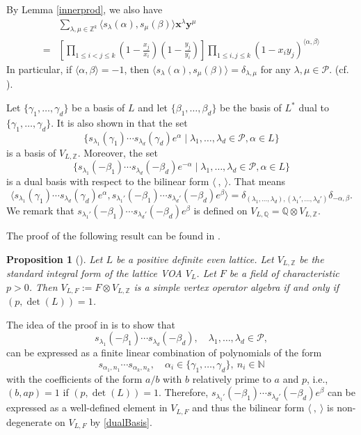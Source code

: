 \documentclass[12pt]{article}
\def\QQ{{\mathbb Q}}
\def\ZZ{{\mathbb Z}}
\def\NN{{\mathbb N}}
\newcommand{\x}{\mathbf{x}}
\newcommand{\y}{\mathbf{y}}
\newtheorem{prop}[thm]{Proposition}
\begin{document}
 By  Lemma \ref{innerprod}, we also have 
 \begin{equation}\label{ss}
 \begin{split}
  & \sum_{\lambda, \mu \in \ZZ^k} \langle s_\lambda(\alpha), s_\mu(\beta)  \rangle \x^\lambda \y^\mu\\
  = &  
\left[\prod_{1\leq i<j\leq k} (1-\frac{x_j}{x_i}) (1-\frac{y_j}{y_i}) \right] \prod_{1 \leq i,j \leq k}  (1- x_iy_j)^{\langle \alpha, \beta\rangle}
\end{split}
 \end{equation}
In particular, if $\langle  \alpha, \beta \rangle= -1$, then   $\langle s_\lambda(\alpha), s_\mu(\beta)  \rangle=\delta_{\lambda, \mu}$  for any $\lambda, \mu\in \mathcal{P}$. (cf.  \cite[Proposition 3.6]{ivoa}). 
 
Let $\{\gamma_1, \dots, \gamma_d\}$ be a basis of $L$ and let 
$\{\beta_1, \dots, \beta_d\} $ be the basis of $L^*$ dual to $\{\gamma_1, \dots, \gamma_d\}$. 
It is also shown in \cite{ivoa} that the set 
\[
\{s_{\lambda_1}(\gamma_1)\cdots s_{\lambda_d}(\gamma_d)e^{\alpha}\mid
\lambda_1, \dots, \lambda_d \in \mathcal{P}, \alpha\in L\}
\] 
is a basis of $V_{L,\ZZ}$. Moreover, 
the set 
\[
\{s_{\lambda_1}(-\beta_1)\cdots s_{\lambda_d}(-\beta_d)e^{-\alpha}\mid
\lambda_1, \dots, \lambda_d \in \mathcal{P}, \alpha\in L\}
\] 
is a dual basis with respect to the bilinear form $\langle \ ,\ \rangle$. That means 
\begin{equation}\label{dualBasis}
\langle s_{\lambda_1}(\gamma_1)\cdots s_{\lambda_d}(\gamma_d)e^{\alpha}, 
s_{\lambda_1'}(-\beta_1)\cdots s_{\lambda_d'}(-\beta_d)e^{\beta}\rangle 
=\delta_{(\lambda_1, \dots, \lambda_d), (\lambda_1', \dots, \lambda_d')} \delta_{-\alpha, \beta}. 
\end{equation}
We remark that  $s_{\lambda_1'}(-\beta_1)\cdots s_{\lambda_d'}(-\beta_d)e^{\beta}$ is defined on $ V_{L,\QQ}= \QQ\otimes V_{L,\ZZ}$. 

The proof of the following result can be found in \cite{Mu}. 
\begin{prop}[\cite{Mu}]\label{simple}
	Let $L$ be a positive definite even lattice. Let $V_{L,\ZZ}$  be the standard integral form of the lattice VOA $V_L$. Let $F$ be a field of characteristic $p>0$.  Then $V_{L,F}:= F\otimes V_{L,\ZZ}$ is a simple vertex operator algebra if and only if  $(p, \det(L))=1$.    
\end{prop} 

The idea of the proof in \cite{Mu}  is to show that 
\[
s_{\lambda_1}(-\beta_1)\cdots s_{\lambda_d}(-\beta_d), \quad 
\lambda_1, \dots, \lambda_d \in \mathcal{P}, 
\]
can be expressed as a  finite linear combination of polynomials of the form 
\[
s_{\alpha_1, n_1} \cdots s_{\alpha_k,n_k}, \quad \alpha_i \in \{ \gamma_1, \dots, \gamma_d\},\  n_i\in \NN
\]
with the coefficients of the form $a/b$ with $b$ relatively prime to $a$ and $p$, i.e., $(b, ap)=1$ if $(p, \det(L))=1$.  Therefore,  $s_{\lambda_1'}(-\beta_1)\cdots s_{\lambda_d'}(-\beta_d)e^{\beta}$ can be expressed as a well-defined element in $V_{L,F}$ and thus the bilinear form $\langle \ ,\ \rangle$ is non-degenerate 
on $V_{L,F}$  by \eqref{dualBasis}. 
\end{document}
